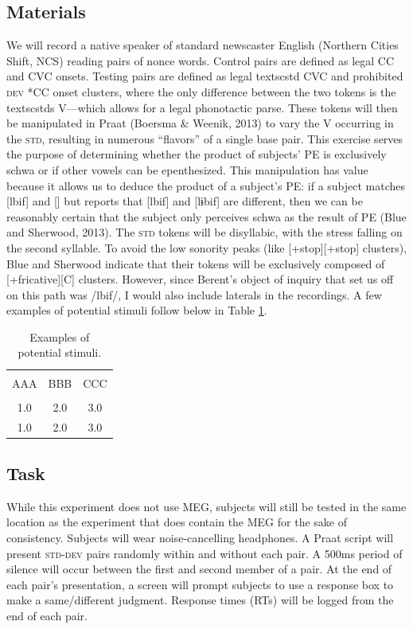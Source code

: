 \documentclass[jou,apacite]{apa6}
\begin{document}
    \subsection{Materials}
    We will record a native speaker of standard newscaster English (Northern Cities Shift, NCS) reading pairs of nonce words. Control pairs are defined as legal CC and CVC onsets. Testing pairs are defined as legal textsc{std} CVC and prohibited \textsc{dev} *CC onset clusters, where the only difference between the two tokens is the textsc{std}s V—which allows for a legal phonotactic parse. These tokens will then be manipulated in Praat (Boersma & Weenik, 2013) to vary the V occurring in the \textsc{std}, resulting in numerous “flavors” of a single base pair. This exercise serves the purpose of determining whether the product of subjects’ PE is exclusively schwa or if other vowels can be epenthesized. This manipulation has value because it allows us to deduce the product of a subject’s PE: if a subject matches [lbif] and [] but reports that [lbif] and [lɨbif] are different, then we can be reasonably certain that the subject only perceives schwa as the result of PE (Blue and Sherwood, 2013). The \textsc{std} tokens will be disyllabic, with the stress falling on the second syllable. To avoid the low sonority peaks (like [+stop][+stop] clusters), Blue and Sherwood indicate that their tokens will be exclusively composed of [+fricative][C] clusters. However, since Berent’s object of inquiry that set us off on this path was /lbif/, I would also include laterals in the recordings. A few examples of potential stimuli follow below in Table \ref{tab1}.


        \begin{table}[!htb]
        \caption{Examples of potential stimuli.}\label{tab1}
        \begin{tabular}{ccc}
        \hline\\[-1.5ex]
        AAA & BBB & CCC \\[0.5ex]
        \hline\\[-1.5ex]
        1.0 & 2.0 & 3.0\\[0.5ex]
        1.0 & 2.0 & 3.0\\[0.5ex]
        \hline
        \end{tabular}
        \end{table}

    \subsection{Task}
    While this experiment does not use MEG, subjects will still be tested in the same location as the experiment that does contain the MEG for the sake of consistency. Subjects will wear noise-cancelling headphones. A Praat script will present \textsc{std-dev} pairs randomly within and without each pair. A 500ms period of silence will occur between the first and second member of a pair. At the end of each pair’s presentation, a screen will prompt subjects to use a response box to make a same/different judgment. Response times (RTs) will be logged from the end of each pair.
\end{document}
